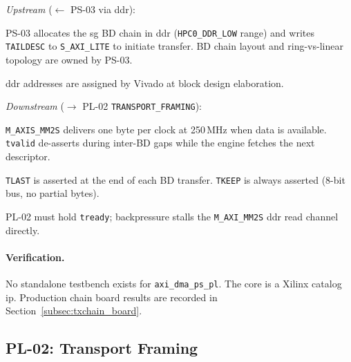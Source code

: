 \textit{Upstream} ($\leftarrow$ PS-03 via \ac{ddr}):
\begin{tightemize}
  \item PS-03 allocates the \ac{sg} BD chain in \ac{ddr}
        (\texttt{HPC0\_DDR\_LOW} range) and writes \texttt{TAILDESC}
        to \texttt{S\_AXI\_LITE} to initiate transfer. BD chain layout
        and ring-vs-linear topology are owned by PS-03.
  \item \ac{ddr} addresses are assigned by Vivado at block design
        elaboration.
\end{tightemize}

\textit{Downstream} ($\rightarrow$ PL-02 \texttt{TRANSPORT\_FRAMING}):
\begin{tightemize}
  \item \texttt{M\_AXIS\_MM2S} delivers one byte per clock at 250\,MHz
        when data is available. \texttt{tvalid} de-asserts during
        inter-BD gaps while the engine fetches the next descriptor.
  \item \texttt{TLAST} is asserted at the end of each BD transfer.
        \texttt{TKEEP} is always asserted (8-bit bus, no partial bytes).
  \item PL-02 must hold \texttt{tready}; backpressure stalls the
        \texttt{M\_AXI\_MM2S} \ac{ddr} read channel directly.
\end{tightemize}


\FloatBarrier
\paragraph{Verification.}

No standalone testbench exists for \texttt{axi\_dma\_ps\_pl}. The core
is a Xilinx catalog \ac{ip}.
Production chain board results are recorded in Section~\ref{subsec:txchain_board}.


\subsection{PL-02: Transport Framing}
\label{subsec:pl02}


